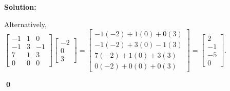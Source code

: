 \documentclass{article}
\newenvironment{solution}
{
  \ignorespaces
  \textbf{Solution:}
}
{
  \ignorespacesafterend
  \begin{flushright}
  {\bfseries \qed}
  \end{flushright}
}
\begin{document}
\begin{solution}
\begin{enumerate}[(a)]
Alternatively,
\(
\begin{bmatrix} -1 & 1 & 0 \\ -1 & 3 & -1 \\ 7 & 1 & 3  \\ 0 & 0 & 0 \end{bmatrix}
\begin{bmatrix} -2 \\ 0 \\ 3 \end{bmatrix} =
\begin{bmatrix} -1(-2)+1(0)+0(3) \\ -1(-2)+3(0)-1(3) \\ 7(-2)+1(0)+3(3) \\ 0(-2)+0(0)+0(3)\end{bmatrix}
  =
\begin{bmatrix} 2 \\ -1 \\ -5 \\ 0 \end{bmatrix}
\).
\end{enumerate}
\end{solution}
\end{document}
